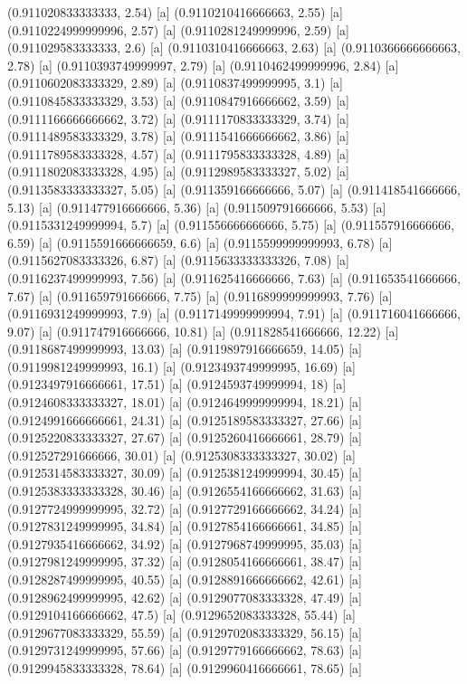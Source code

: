 {{{(0.911020833333333, 2.54) [a] 
(0.9110210416666663, 2.55) [a] 
(0.9110224999999996, 2.57) [a] 
(0.9110281249999996, 2.59) [a] 
(0.911029583333333, 2.6) [a] 
(0.9110310416666663, 2.63) [a] 
(0.9110366666666663, 2.78) [a] 
(0.9110393749999997, 2.79) [a] 
(0.9110462499999996, 2.84) [a] 
(0.9110602083333329, 2.89) [a] 
(0.9110837499999995, 3.1) [a] 
(0.9110845833333329, 3.53) [a] 
(0.9110847916666662, 3.59) [a] 
(0.9111166666666662, 3.72) [a] 
(0.9111170833333329, 3.74) [a] 
(0.9111489583333329, 3.78) [a] 
(0.9111541666666662, 3.86) [a] 
(0.9111789583333328, 4.57) [a] 
(0.9111795833333328, 4.89) [a] 
(0.9111802083333328, 4.95) [a] 
(0.9112989583333327, 5.02) [a] 
(0.9113583333333327, 5.05) [a] 
(0.911359166666666, 5.07) [a] 
(0.911418541666666, 5.13) [a] 
(0.911477916666666, 5.36) [a] 
(0.911509791666666, 5.53) [a] 
(0.9115331249999994, 5.7) [a] 
(0.911556666666666, 5.75) [a] 
(0.911557916666666, 6.59) [a] 
(0.9115591666666659, 6.6) [a] 
(0.9115599999999993, 6.78) [a] 
(0.9115627083333326, 6.87) [a] 
(0.9115633333333326, 7.08) [a] 
(0.9116237499999993, 7.56) [a] 
(0.911625416666666, 7.63) [a] 
(0.911653541666666, 7.67) [a] 
(0.911659791666666, 7.75) [a] 
(0.9116899999999993, 7.76) [a] 
(0.9116931249999993, 7.9) [a] 
(0.9117149999999994, 7.91) [a] 
(0.911716041666666, 9.07) [a] 
(0.911747916666666, 10.81) [a] 
(0.911828541666666, 12.22) [a] 
(0.9118687499999993, 13.03) [a] 
(0.9119897916666659, 14.05) [a] 
(0.9119981249999993, 16.1) [a] 
(0.9123493749999995, 16.69) [a] 
(0.9123497916666661, 17.51) [a] 
(0.9124593749999994, 18) [a] 
(0.9124608333333327, 18.01) [a] 
(0.9124649999999994, 18.21) [a] 
(0.9124991666666661, 24.31) [a] 
(0.9125189583333327, 27.66) [a] 
(0.9125220833333327, 27.67) [a] 
(0.9125260416666661, 28.79) [a] 
(0.912527291666666, 30.01) [a] 
(0.9125308333333327, 30.02) [a] 
(0.9125314583333327, 30.09) [a] 
(0.9125381249999994, 30.45) [a] 
(0.9125383333333328, 30.46) [a] 
(0.9126554166666662, 31.63) [a] 
(0.9127724999999995, 32.72) [a] 
(0.9127729166666662, 34.24) [a] 
(0.9127831249999995, 34.84) [a] 
(0.9127854166666661, 34.85) [a] 
(0.9127935416666662, 34.92) [a] 
(0.9127968749999995, 35.03) [a] 
(0.9127981249999995, 37.32) [a] 
(0.9128054166666661, 38.47) [a] 
(0.9128287499999995, 40.55) [a] 
(0.9128891666666662, 42.61) [a] 
(0.9128962499999995, 42.62) [a] 
(0.9129077083333328, 47.49) [a] 
(0.9129104166666662, 47.5) [a] 
(0.9129652083333328, 55.44) [a] 
(0.9129677083333329, 55.59) [a] 
(0.9129702083333329, 56.15) [a] 
(0.9129731249999995, 57.66) [a] 
(0.9129779166666662, 78.63) [a] 
(0.9129945833333328, 78.64) [a] 
(0.9129960416666661, 78.65) [a] 
}}}
